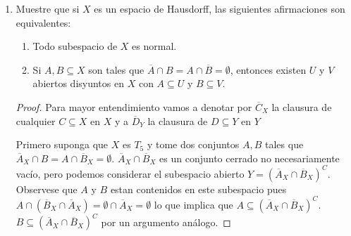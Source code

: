 \documentclass[paper=letter, fontsize=11pt]{scrartcl} %
\numberwithin{equation}{section} %
\numberwithin{figure}{section} %
\numberwithin{table}{section} %
\begin{document}
\begin{enumerate}
\begin{proof}
Ahora volviendo a nuestro problema, nuestra hipotesis indica que existe una inyección $ i:A \to \mathbb{R} $ y entonces considere $ i(A) $ la imagen de $ A $ en $ \mathbb{R} $ y observe que $ [0,1]^A \cong [0,1]^{i(A)} $. Entonces tome como función continua $ g: [0,1]^\mathbb{R}\to [0,1]^{i(A)} $ la función tal que $ f \mapsto f\upharpoonright_{i(A)} $. Esta función es continua porque para cualquier abierto en $ [0,1]^{i(A)} $ que son restricciones finitas sobre las coordenadas su preimagen también es el conjunto de funciones restrigidas en las mismas finitas coordenadas y por lo tanto también es abierto en $ [0,1]^\mathbb{R} $. Por lo tanto, por el teorema anterior $ [0,1]^A $ también es separable
\end{proof}

\item Muestre que si $ X $ es un espacio de Hausdorff, las siguientes afirmaciones son equivalentes:
\begin{enumerate}
\item Todo subespacio de $ X $ es normal.
\item Si $ A,B \subseteq X $ son tales que $ \overline{A}\cap B = A \cap \overline{B}=\emptyset $, entonces existen $ U $ y $ V $ abiertos disyuntos en $ X $ con $ A \subseteq U $ y $ B \subseteq V $.

\end{enumerate}

\begin{proof}

Para mayor entendimiento vamos a denotar por $ \overline{C}_X $ la clausura de cualquier $ C \subseteq X $ en $ X $ y a $ \overline{D}_Y $ la clausura de $ D \subseteq Y $ en $ Y $

Primero suponga que $ X $ es $ T_5 $ y tome dos conjuntos $ A, B $ tales que  $ \overline{A}_X\cap B = A \cap \overline{B}_X=\emptyset $.  $ \overline{A}_X \cap \overline{B}_X $ es un conjunto cerrado no necesariamente vacío, pero podemos considerar el subespacio abierto $ Y =  (\overline{A}_X \cap \overline{B}_X)^C $. Observese que $ A $ y $ B $ estan contenidos en este subespacio pues $ A \cap (\overline{B}_X \cap \overline{A}_X) = \emptyset \cap \overline{A}_X = \emptyset $ lo que implica que $ A \subseteq (\overline{A}_X \cap \overline{B}_X)^C  $. $ B \subseteq (\overline{A}_X \cap \overline{B}_X)^C $ por un argumento análogo.


\end{proof}
\end{enumerate}
\end{document}
